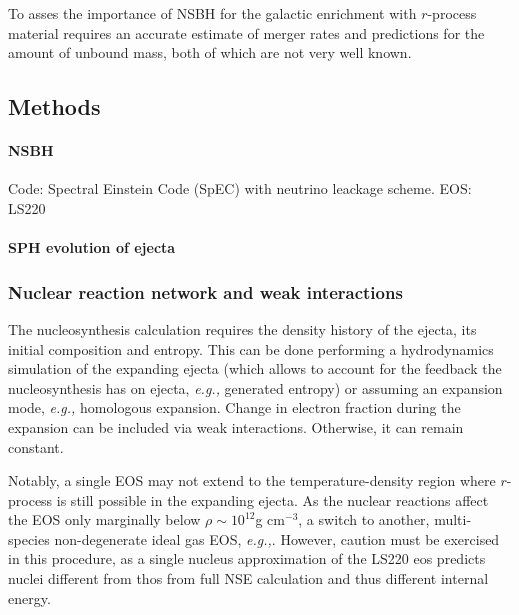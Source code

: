 \documentclass[11pt,a4paper,headinclude=true,DIV=14,BCOR=8mm,chapterprefix,listof=totoc,twoside,openright,abstracton]{scrbook}
\begin{document}
To asses the importance of NSBH for the galactic enrichment with $r$-process material requires an accurate estimate of merger rates and predictions for the amount of unbound mass, both of which are not very well known. 


\subsection{Methods}

\paragraph{NSBH} Code: Spectral Einstein Code (SpEC) with neutrino leackage scheme. EOS: LS220

\paragraph{SPH evolution of ejecta}

\subsubsection{Nuclear reaction network and weak interactions}

The nucleosynthesis calculation requires the density history of the ejecta, its initial composition and entropy. This can be done performing a hydrodynamics simulation of the expanding ejecta (which allows to account for the feedback the nucleosynthesis has on ejecta, \textit{e.g.,} generated entropy) or assuming an expansion mode, \textit{e.g.,} homologous expansion. Change in electron fraction during the expansion can be included via weak interactions. Otherwise, it can remain constant.

Notably, a single EOS may not extend to the temperature-density region where $r$-process is still possible in the expanding ejecta. As the nuclear reactions affect the EOS only marginally below $\rho\sim 10^{12}$g cm$^{-3}$, a switch to another, multi-species non-degenerate ideal gas EOS, \textit{e.g.,}\cite{Timmes and Arnett, 1999}. However, caution must be exercised in this procedure, as a single nucleus approximation of the LS220 eos predicts nuclei different from thos from full NSE calculation and thus different internal energy. 
\end{document}
